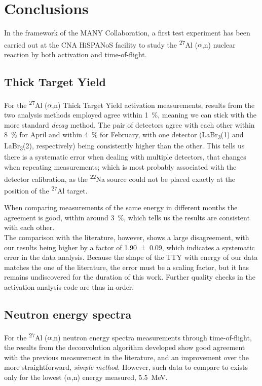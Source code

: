 \documentclass[a4paper,12pt]{report}
\newcommand{\an}{($\alpha$,n) }
\newcommand{\Aliso}{\textsuperscript{27}Al }
\newcommand{\Na}{\textsuperscript{22}Na }
\begin{document}
\chapter{Conclusions}
In the framework of the MANY Collaboration, a first test experiment has been carried out at the CNA HiSPANoS facility to study the \Aliso\an nuclear reaction by both activation and time-of-flight.

\section{Thick Target Yield}
For the \Aliso\an Thick Target Yield activation measurements, results from the two analysis methods employed agree within \qty{1}{\percent}, meaning we can stick with the more standard \textit{decay} method.
The pair of detectors agree with each other within \qty{8}{\percent} for April and within \qty{4}{\percent} for February, with one detector (LaBr\textsubscript{3}(1) and LaBr\textsubscript{3}(2), respectively) being consistently higher than the other.
This tells us there is a systematic error when dealing with multiple detectors, that changes when repeating measurements; which is most probably associated with the detector calibration, as the \Na source could not be placed exactly at the position of the \Aliso target.

When comparing measurements of the same energy in different months the agreement is good, within around \qty{3}{\percent}, which tells us the results are consistent with each other.
\\

The comparison with the literature, however, shows a large disagreement, with our results being higher by a factor of \num{1.90(9)}, which indicates a systematic error in the data analysis.
Because the shape of the TTY with energy of our data matches the one of the literature, the error must be a scaling factor, but it has remains undiscovered for the duration of this work.
Further quality checks in the activation analysis code are thus in order.
\\

\section{Neutron energy spectra}
For the \Aliso\an neutron energy spectra measurements through time-of-flight, the results from the deconvolution algorithm developed show good agreement with the previous measurement in the literature, and an improvement over the more straightforward, \textit{simple method}.
However, such data to compare to exists only for the lowest \an energy measured, \qty{5.5}{\MeV}.
\end{document}
